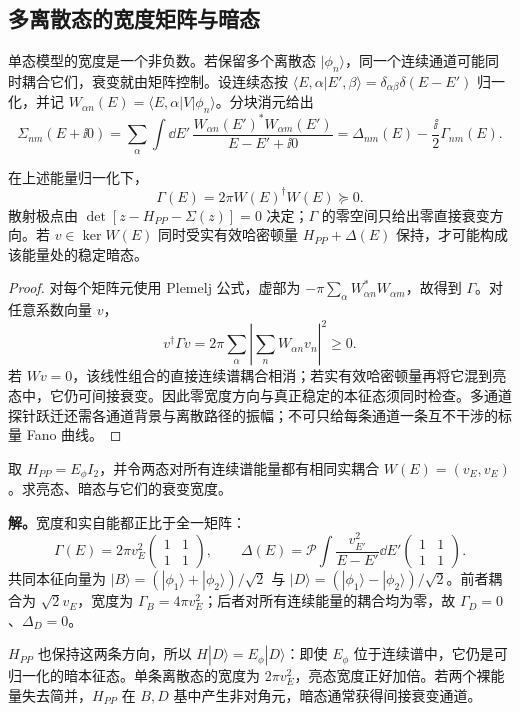\subsection{多离散态的宽度矩阵与暗态}

单态模型的宽度是一个非负数。若保留多个离散态 $|\phi_n\rangle$，同一个连续通道可能同时耦合它们，衰变就由矩阵控制。设连续态按
$\langle E,\alpha|E',\beta\rangle=\delta_{\alpha\beta}\delta(E-E')$
归一化，并记 $W_{\alpha n}(E)=\langle E,\alpha|V|\phi_n\rangle$。分块消元给出
\[
 \Sigma_{nm}(E+\ii0)
 =\sum_\alpha\int\dd E'\,
 \frac{W_{\alpha n}(E')^*W_{\alpha m}(E')}{E-E'+\ii0}
 =\Delta_{nm}(E)-\frac\ii2\Gamma_{nm}(E).
\]

\begin{proposition}[连续谱产生的宽度矩阵]
在上述能量归一化下，
\[
 \Gamma(E)=2\pi W(E)^\dagger W(E)\succeq0.
\]
散射极点由 $\det[z-H_{PP}-\Sigma(z)]=0$ 决定；$\Gamma$ 的零空间只给出零直接衰变方向。若 $v\in\ker W(E)$ 同时受实有效哈密顿量 $H_{PP}+\Delta(E)$ 保持，才可能构成该能量处的稳定暗态。
\end{proposition}
\begin{proof}
对每个矩阵元使用 Plemelj 公式，虚部为 $-\pi\sum_\alpha W_{\alpha n}^*W_{\alpha m}$，故得到 $\Gamma$。对任意系数向量 $v$，
\[
 v^\dagger\Gamma v=2\pi\sum_\alpha
 \left|\sum_nW_{\alpha n}v_n\right|^2\ge0.
\]
若 $Wv=0$，该线性组合的直接连续谱耦合相消；若实有效哈密顿量再将它混到亮态中，它仍可间接衰变。因此零宽度方向与真正稳定的本征态须同时检查。多通道探针跃迁还需各通道背景与离散路径的振幅；不可只给每条通道一条互不干涉的标量 Fano 曲线。
\end{proof}

\begin{workedexample}[两条简并离散态耦合到同一连续通道]
取 $H_{PP}=E_\phi I_2$，并令两态对所有连续谱能量都有相同实耦合 $W(E)=(v_E,v_E)$。求亮态、暗态与它们的衰变宽度。

\textbf{解。}宽度和实自能都正比于全一矩阵：
\[
 \Gamma(E)=2\pi v_E^2\begin{pmatrix}1&1\\1&1\end{pmatrix},\qquad
 \Delta(E)=\mathcal P\int\frac{v_{E'}^2}{E-E'}\dd E'
                  \begin{pmatrix}1&1\\1&1\end{pmatrix}.
\]
共同本征向量为 $|B\rangle=(|\phi_1\rangle+|\phi_2\rangle)/\sqrt2$ 与
$|D\rangle=(|\phi_1\rangle-|\phi_2\rangle)/\sqrt2$。前者耦合为 $\sqrt2v_E$，宽度为 $\Gamma_B=4\pi v_E^2$；后者对所有连续能量的耦合均为零，故 $\Gamma_D=0$、$\Delta_D=0$。

$H_{PP}$ 也保持这两条方向，所以 $H|D\rangle=E_\phi|D\rangle$：即使 $E_\phi$ 位于连续谱中，它仍是可归一化的暗本征态。单条离散态的宽度为 $2\pi v_E^2$，亮态宽度正好加倍。若两个裸能量失去简并，$H_{PP}$ 在 $B,D$ 基中产生非对角元，暗态通常获得间接衰变通道。
\end{workedexample}
